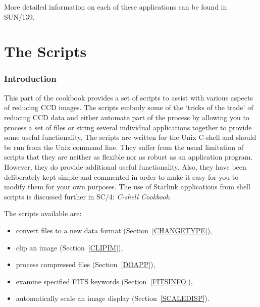 \documentclass[twoside,11pt]{article}
\newcommand{\stardocinitials}  {SC}
\newcommand{\stardocnumber}    {5.3}
\newcommand{\stardocname}{\stardocinitials /\stardocnumber}
\newcommand{\xref}[3]{#1}
\newcommand{\xlabel}[1]{}
\begin{document}
More detailed information on each of these applications can be found in
\xref{SUN/139}{sun139}{}\/\cite{SUN139}.


\cleardoublepage
\markboth{\stardocname}{\stardocname}
\part{The Scripts}
\markboth{\stardocname}{\stardocname}
\section{\xlabel{SUMSC}\label{SUMSC}Introduction}

This part of the cookbook provides a set of scripts to assist with
various aspects of reducing CCD images.  The scripts embody some of the
`tricks of the trade' of reducing CCD data and either automate part of
the process by allowing you to process a set of files or string several
individual applications together to provide some useful functionality.
The scripts are written for the Unix C-shell and should be run from the
Unix command line.  They suffer from the usual limitation of scripts
that they are neither as flexible nor as robust as an application program.
However, they do provide additional useful functionality.  Also, they
have been deliberately kept simple and commented in order to make it
easy for you to  modify them for your own purposes.  The use of Starlink
applications from shell scripts is discussed further in \xref{SC/4:
{\it C-shell Cookbook}\/}{sc4}{}\cite{SC4}.

The scripts available are:

\begin{itemize}

  \item convert files to a new data format (Section~\ref{CHANGETYPE}),

  \item clip an image (Section~\ref{CLIPIM}),

  \item process compressed files (Section~\ref{DOAPP}),

  \item examine specified FITS keywords (Section~\ref{FITSINFO}),

  \item automatically scale an image display (Section~\ref{SCALEDISP}).

\end{itemize}
\end{document}
